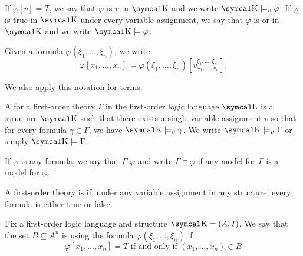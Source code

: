 \begin{definition}
  If \( \varphi[v] = T \), we say that \( \varphi \) is  \( v \) in \( \CK \) and we write \( \CK \models_v \varphi \). If \( \varphi \) is true in \( \CK \) under every variable assignment, we say that \( \varphi \) is  or  in \( \CK \) and we write \( \CK \models \varphi \).

  Given a formula \( \varphi(\xi_1, \ldots, \xi_n) \), we write
  \begin{equation*}
    \varphi[x_1, \ldots, x_n] \coloneqq \varphi(\xi_1, \ldots, \xi_n)[v_{x_1, \ldots, x_n}^{\xi_1, \ldots, \xi_n}].
  \end{equation*}

  We also apply this notation for terms.
\end{definition}

\begin{definition}\label{def:first_order_model}
  A  for a first-order theory \( \Gamma \) in the first-order logic language \( \CL \) is a structure \( \CK \) such that there exists a single variable assignment \( v \) so that for every formula \( \gamma \in \Gamma \), we have \( \CK \models_v \gamma \). We write \( \CK \models_v \Gamma \) or simply \( \CK \models \Gamma \).

  If \( \varphi \) is any formula, we say that \( \Gamma \)  \( \varphi \) and write \( \Gamma \models \varphi \) if any model for \( \Gamma \) is a model for \( \varphi \).
\end{definition}

\begin{definition}\label{def:first_order_consistency}
  A first-order theory is  if, under any variable assignment in any structure, every formula is either true or false.
\end{definition}

\begin{definition}\label{def:first_order_definability}
  Fix a first-order logic language and structure \( \CK = (A, I) \). We say that the set \( B \subseteq A^n \) is  using the formula \( \varphi(\xi_1, \ldots, \xi_n) \) if
  \begin{equation*}
    \varphi[x_1, \ldots, x_n] = T \text{ if and only if } (x_1, \ldots, x_n) \in B
  \end{equation*}
\end{definition}

